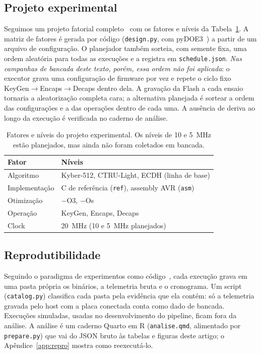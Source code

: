 \documentclass[acmsmall,nonacm,language=english,language=brazilian]{acmart}
\begin{document}
\subsection{Projeto experimental}
Seguimos um projeto fatorial completo~\citep{jain1991} com os fatores e níveis
da Tabela~\ref{tab:fatores}. A matriz de fatores é gerada por código
(\texttt{design.py}, com pyDOE3~\citep{pydoe3}) a partir de um arquivo de
configuração. O planejador também sorteia, com semente fixa, uma ordem
aleatória para todas as execuções e a registra em \texttt{schedule.json}.
\emph{Nas campanhas de bancada deste texto, porém, essa ordem não foi
aplicada}: o executor grava uma configuração de firmware por vez e repete o
ciclo fixo \textsf{KeyGen}$\rightarrow$\textsf{Encaps}$\rightarrow$\textsf{Decaps}
dentro dela. A gravação da Flash a cada ensaio tornaria a aleatorização
completa cara; a alternativa planejada é sortear a ordem das configurações e a
das operações dentro de cada uma. A ausência de deriva ao longo da execução é
verificada no caderno de análise.

\begin{table}[bp]
  \caption{Fatores e níveis do projeto experimental. Os níveis de 10 e
  5~MHz estão planejados, mas ainda não foram coletados em bancada.}
  \label{tab:fatores}
  \small
  \begin{tabular}{@{}ll@{}}
    \toprule
    Fator & Níveis \\
    \midrule
    Algoritmo     & Kyber-512, CTRU-Light, ECDH (linha de base) \\
    Implementação & C de referência (\texttt{ref}), assembly AVR (\texttt{asm}) \\
    Otimização    & $-$O3, $-$Os \\
    Operação      & KeyGen, Encaps, Decaps \\
    Clock         & 20~MHz (10 e 5~MHz planejados) \\
    \bottomrule
  \end{tabular}
\end{table}

\subsection{Reprodutibilidade}
Seguindo o paradigma de experimentos como código~\citep{expascode}, cada
execução grava em uma pasta própria os binários, a telemetria bruta e o
cronograma. Um script (\texttt{catalog.py}) classifica cada pasta pela
evidência que ela contém: só a telemetria gravada pelo host com a placa
conectada conta como dado de bancada. Execuções simuladas, usadas no
desenvolvimento do pipeline, ficam fora da análise. A análise é um caderno
Quarto em R (\texttt{analise.qmd}, alimentado por \texttt{prepare.py}) que vai
do JSON bruto às tabelas e figuras deste artigo; o Apêndice~\ref{app:repro}
mostra como reexecutá-lo.
\end{document}
